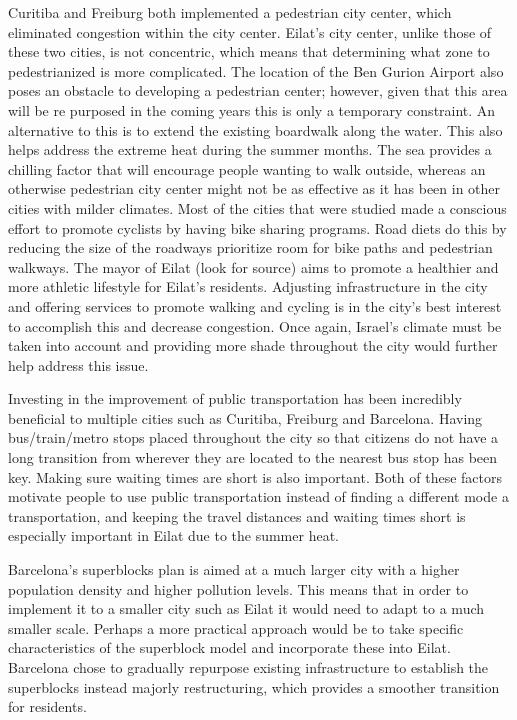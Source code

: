 \documentclass[12pt]{article}                       %
\begin{document}
Curitiba and Freiburg both implemented a pedestrian city center, which eliminated congestion within the city center. Eilat's city center, unlike those of these two cities, is not concentric, which means that determining what zone to pedestrianized is more complicated. The location of the Ben Gurion Airport also poses an obstacle to developing a pedestrian center; however, given that this area will be re purposed in the coming years this is only a temporary constraint. An alternative to this is to extend the existing boardwalk along the water. This also helps address the extreme heat during the summer months. The sea provides a chilling factor that will encourage people wanting to walk outside, whereas an otherwise pedestrian city center might not be as effective as it has been in other cities with milder climates. Most of the cities that were studied made a conscious effort to promote cyclists by having bike sharing programs. Road diets do this by reducing the size of the roadways prioritize room for bike paths and pedestrian walkways. The mayor of Eilat (look for source) aims to promote a healthier and more athletic lifestyle for Eilat's residents. Adjusting infrastructure in the city and offering services to promote walking and cycling is in the city's best interest to accomplish this and decrease congestion. Once again, Israel's climate must be taken into account and providing more shade throughout the city would further help address this issue. 

Investing in the improvement of public transportation has been incredibly beneficial to multiple cities such as Curitiba, Freiburg and Barcelona. Having bus/train/metro stops placed throughout the city so that citizens do not have a long transition from wherever they are located to the nearest bus stop has been key. Making sure waiting times are short is also important. Both of these factors motivate people to use public transportation instead of finding a different mode a transportation, and keeping the travel distances and waiting times short is especially important in Eilat due to the summer heat. 

Barcelona's superblocks plan is aimed at a much larger city with a higher population density and higher pollution levels. This means that in order to implement it to a smaller city such as Eilat it would need to adapt to a much smaller scale. Perhaps a more practical approach would be to take specific characteristics of the superblock model and incorporate these into Eilat. Barcelona chose to gradually repurpose existing infrastructure to establish the superblocks instead majorly restructuring, which provides a smoother transition for residents.
\end{document}
